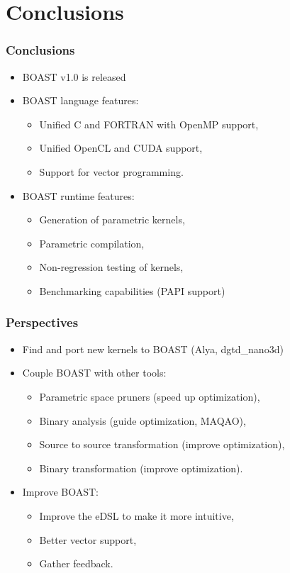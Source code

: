 \documentclass{beamer}
\begin{document}
\section{Conclusions}

\begin{frame}
  \frametitle{Conclusions}
  \begin{itemize}
    \item BOAST v1.0 is released
    \item BOAST language features:
    \begin{itemize}
      \item Unified C and FORTRAN with OpenMP support,
      \item Unified OpenCL and CUDA support,
      \item Support for vector programming.
    \end{itemize}
    \item BOAST runtime features:
    \begin{itemize}
      \item Generation of parametric kernels,
      \item Parametric compilation,
      \item Non-regression testing of kernels,
      \item Benchmarking capabilities (PAPI support)
    \end{itemize}
  \end{itemize}
\end{frame}

\begin{frame}
  \frametitle{Perspectives}
  \begin{itemize}
    \item Find and port new kernels to BOAST (Alya, dgtd\_nano3d)
    \item Couple BOAST with other tools:
    \begin{itemize}
      \item Parametric space pruners (speed up optimization),
      \item Binary analysis (guide optimization, MAQAO),
      \item Source to source transformation (improve optimization),
      \item Binary transformation (improve optimization).
    \end{itemize}
    \item Improve BOAST:
    \begin{itemize}
      \item Improve the eDSL to make it more intuitive,
      \item Better vector support,
      \item Gather feedback.
    \end{itemize}
  \end{itemize}
\end{frame}
\end{document}

